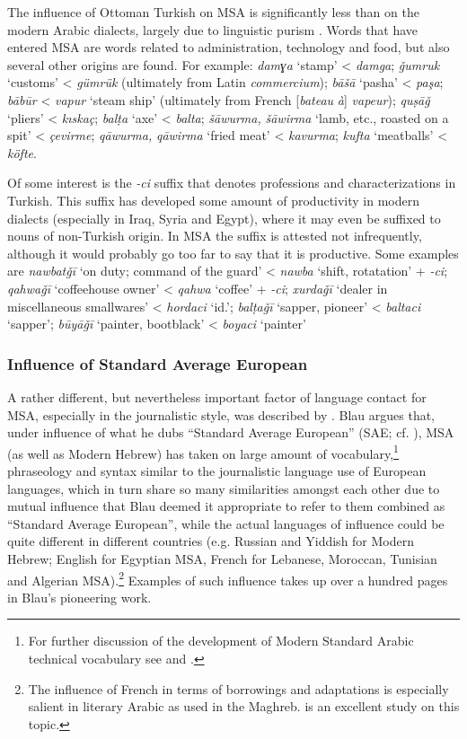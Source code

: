 \documentclass[output=paper]{langsci/langscibook}
\begin{document}
The influence of Ottoman Turkish on MSA is significantly less than on the modern Arabic dialects, largely due to linguistic purism \citep{Procházka2011Turkish}. Words that have entered MSA are words related to administration, technology and food, but also several other origins are found. For example: \textit{damɣa} ‘stamp’ < \textit{damga}; \textit{ǧumruk} ‘customs’ < \textit{gümrük} (ultimately from Latin \textit{commercium}); \textit{bāšā} ‘pasha’ < \textit{paşa}; \textit{bābūr} < \textit{vapur} ‘steam ship’ (ultimately from French [\textit{bateau} \textit{à}] \textit{vapeur}); \textit{quṣāǧ} ‘pliers’ < \textit{kıskaç}; \textit{balṭa} ‘axe’ < \textit{balta}; \textit{šāwurma,} \textit{šāwirma} ‘lamb, etc., roasted on a spit’ < \textit{çevirme}; \textit{qāwurma,} \textit{qāwirma} ‘fried meat’ < \textit{kavurma}; \textit{kufta} ‘meatballs’ < \textit{köfte}.

Of some interest is the \textit{-ci} suffix that denotes professions and characterizations in Turkish. This suffix has developed some amount of productivity in modern dialects (especially in Iraq, Syria and Egypt), where it may even be suffixed to nouns of non-Turkish origin. In MSA the suffix is attested not infrequently, although it would probably go too far to say that it is productive. Some examples are \textit{nawbatǧī} ‘on duty; command of the guard’ < \textit{nawba} ‘shift, rotatation’ + \textit{-ci}; \textit{qahwaǧī} ‘coffeehouse owner’ < \textit{qahwa} ‘coffee’ + \textit{-ci}; \textit{xurdaǧī} ‘dealer in miscellaneous smallwares’ < \textit{hordaci} ‘id.’; \textit{balṭaǧī} ‘sapper, pioneer’ < \textit{baltaci} ‘sapper’; \textit{būyāǧī} ‘painter, bootblack’ < \textit{boyaci} ‘painter’

\subsubsection{Influence of Standard Average European}

A rather different, but nevertheless important factor of language contact for MSA, especially in the journalistic style, was described by \citet{Blau1969}. Blau argues that, under influence of what he dubs “Standard Average European” (SAE; cf. \citealt{Whorf1956}), MSA (as well as Modern Hebrew) has taken on large amount of vocabulary,\footnote{For further discussion of the development of Modern Standard Arabic technical vocabulary see \citet{Dichy2011} and \citet{Jacquart94}.} phraseology and syntax similar to the journalistic language use of European languages, which in turn share so many similarities amongst each other due to mutual influence that Blau deemed it appropriate to refer to them combined as “Standard Average European”, while the actual languages of influence could be quite different in different countries (e.g. Russian and Yiddish for Modern Hebrew; English for Egyptian MSA, French for Lebanese, Moroccan, Tunisian and Algerian MSA).\footnote{The influence of French in terms of borrowings and adaptations is especially salient in literary Arabic as used in the Maghreb. \citet{Kropftisch1977} is an excellent study on this topic.} Examples of such influence takes up over a hundred pages in Blau’s pioneering work.
\end{document}
